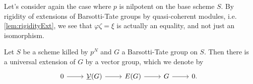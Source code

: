 \begin{rem}[]
	Let's consider again the case where $p$ is 
	nilpotent on the base scheme $S$.
	By rigidity of extensions of Barsotti-Tate groups
	by quasi-coherent modules, i.e. \cref{lem:rigidityExt}, 
	we see that $\varphi\zeta = \xi$ is
	actually an equality, and not just an isomorphism.
\end{rem}


\begin{prop}[]\label{UniversalExtensionConstruction}
	Let $S$ be a scheme killed by $p^N$ and $G$
	a Barsotti-Tate group on $S$.
	Then there is a universal extension of $G$ by a vector group,
	which we denote by
	\begin{equation*}
	\begin{tikzcd}
		0 \arrow[r, "", rightarrow] &
		\underline{\mathcal{V}}(G) \arrow[r, "", rightarrow] &
		E(G) \arrow[r, "", rightarrow] &
		G \arrow[r, "", rightarrow] &
		0
	.\end{tikzcd}
	\end{equation*}
\end{prop}
